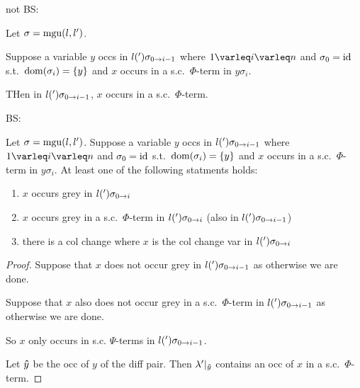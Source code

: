 \documentclass[,%
	paper=a4,%
	DIV11, %
	twoside=false,%
	liststotoc,
	bibtotoc,
	draft=false,%
	numbers=noendperiod
]{scrartcl}
\begin{document}
not BS:

Let $\sigma = \operatorname{mgu}(l, l')$.

	Suppose a variable $y$ occs in $l(')\sigma_{0 \rightarrow i-1}$ where $1\varleq i \varleq n$ and $\sigma_0 = \operatorname{id}$
	s.t.\ $\operatorname{dom}(\sigma_i) = \{y\}$ and $x$ occurs in a s.c.\ $\Phi$-term in $y\sigma_i$.

	THen in $l(')\sigma_{0 \rightarrow i-1}$, $x$ occurs in a s.c.\ $\Phi$-term.


BS:
{

\tiny
\begin{lemma}
	Let $\sigma = \operatorname{mgu}(l, l')$.
	Suppose a variable $y$ occs in $l(')\sigma_{0 \rightarrow i-1}$ where $1\varleq i \varleq n$ and $\sigma_0 = \operatorname{id}$
	s.t.\ $\operatorname{dom}(\sigma_i) = \{y\}$ and $x$ occurs in a s.c.\ $\Phi$-term in $y\sigma_i$.
	At least one of the following statments holds:

	\begin{enumerate}
		\item $x$ occurs grey in $l(')\sigma_{0 \rightarrow i}$
		\item $x$ occurs grey in a s.c.\ $\Phi$-term in $l(')\sigma_{0 \rightarrow i}$ (also in $l(')\sigma_{0 \rightarrow i-1}$)
		\item there is a col change where $x$ is the col change var in $l(')\sigma_{0 \rightarrow i}$ 
	\end{enumerate}
\end{lemma}
\begin{proof}
	Suppose that $x$ does not occur grey in $l(')\sigma_{0 \rightarrow i-1}$ as otherwise we are done.

	Suppose that $x$ also does not occur grey in a s.c.\ $\Phi$-term in $l(')\sigma_{0 \rightarrow i-1}$ as otherwise we are done.
	
	So $x$ only occurs in s.c. $\Psi$-terms in $l(')\sigma_{0 \rightarrow i-1}$.

	Let $\bm\hat y$ be the occ of $y$ of the diff pair. Then $\lambda'|_{\bm\hat y}$ contains an occ of $x$ in a s.c.\ $\Phi$-term.

\end{proof}

}
\end{document}
